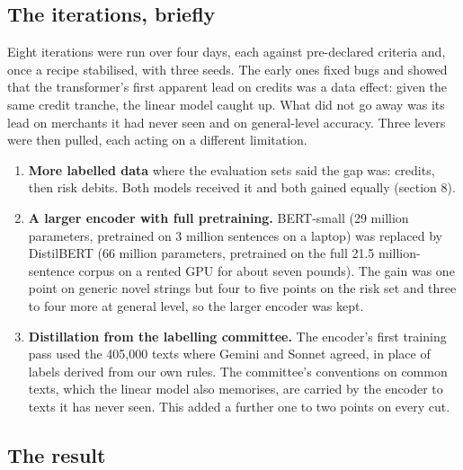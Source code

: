 \subsection{The iterations, briefly}
Eight iterations were run over four days, each against pre-declared criteria and, once a recipe stabilised, with three seeds. The early ones fixed bugs and showed that the transformer's first apparent lead on credits was a data effect: given the same credit tranche, the linear model caught up. What did not go away was its lead on merchants it had never seen and on general-level accuracy. Three levers were then pulled, each acting on a different limitation.

\begin{enumerate}
\item \textbf{More labelled data} where the evaluation sets said the gap was: credits, then risk debits. Both models received it and both gained equally (section 8).
\item \textbf{A larger encoder with full pretraining.} BERT-small (29 million parameters, pretrained on 3 million sentences on a laptop) was replaced by DistilBERT (66 million parameters, pretrained on the full 21.5 million-sentence corpus on a rented GPU for about seven pounds). The gain was one point on generic novel strings but four to five points on the risk set and three to four more at general level, so the larger encoder was kept.
\item \textbf{Distillation from the labelling committee.} The encoder's first training pass used the 405,000 texts where Gemini and Sonnet agreed, in place of labels derived from our own rules. The committee's conventions on common texts, which the linear model also memorises, are carried by the encoder to texts it has never seen. This added a further one to two points on every cut.
\end{enumerate}
\subsection{The result}


